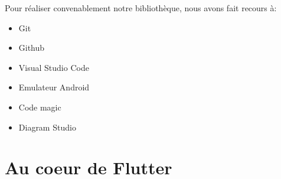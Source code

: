 \documentclass[a4paper,12pt]{report}
\begin{document}

                Pour réaliser convenablement notre bibliothèque, nous avons fait recours à:
                
                \begin{itemize}
                    \item Git
                    \item Github
                    \item Visual Studio Code
                    \item Emulateur Android
                    \item Code magic
                    \item Diagram Studio
                \end{itemize}
                
    \chapter{Au coeur de Flutter}







    \begin{thebibliography}{2}
    \end{thebibliography}
\end{document}
